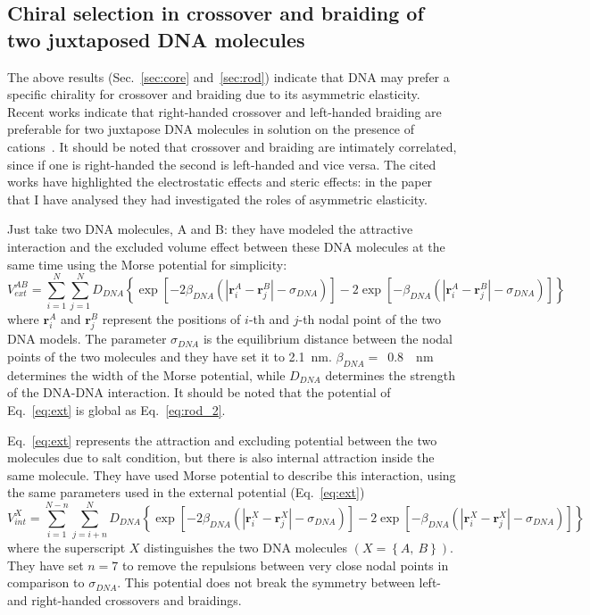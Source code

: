 \documentclass[a4paper,10pt]{article}
\begin{document}
\subsection{Chiral selection in crossover and braiding of two juxtaposed DNA molecules}\label{sec:braF}
The above results (Sec.~\ref{sec:core} and~\ref{sec:rod}) indicate that DNA may prefer a specific chirality for crossover and braiding due to its asymmetric elasticity.
Recent works indicate that right-handed crossover and left-handed braiding are preferable for two juxtapose DNA molecules in solution on the presence of cations~\cite{br_1, br_2, br_3, br_4, br_5}.
It should be noted that crossover and braiding are intimately correlated, since if one is right-handed the second is left-handed and vice versa.
The cited works have highlighted the electrostatic effects and steric effects: in the paper that I have analysed they had investigated the roles of asymmetric elasticity.

Just take two DNA molecules, A and B: they have modeled the attractive interaction and the excluded volume effect between these DNA molecules at the same time using the Morse potential for simplicity:
\begin{equation}\label{eq:ext}
V_{ext}^{AB}=\sum_{i=1}^{N}\sum_{j=1}^{N}D_{DNA}\left \{\exp\left [-2\beta_{DNA}\left (\left |\textbf{r}_{i}^{A}-\textbf{r}_{j}^{B}\right |-\sigma_{DNA}\right )\right ]-2\exp\left [-\beta_{DNA}\left (\left |\textbf{r}_{i}^{A}-\textbf{r}_{j}^{B}\right |-\sigma_{DNA}\right )\right ]\right \}
\end{equation}
where $\textbf{r}_{i}^{A}$ and $\textbf{r}_{j}^{B}$ represent the positions of $i$-th and $j$-th nodal point of the two DNA models.
The parameter $\sigma_{DNA}$ is the equilibrium distance between the nodal points of the two molecules and they have set it to \SI{2.1}{\nm}.
$\beta_{DNA}=$~\SI{0.8}{\per\nm} determines the width of the Morse potential, while $D_{DNA}$ determines the strength of the DNA-DNA interaction.
It should be noted that the potential of Eq.~\ref{eq:ext} is global as Eq.~\ref{eq:rod_2}.

Eq.~\ref{eq:ext} represents the attraction and excluding potential between the two molecules due to salt condition, but there is also internal attraction inside the same molecule.
They have used Morse potential to describe this interaction, using the same parameters used in the external potential (Eq.~\ref{eq:ext})
\begin{equation}\label{eq:int}
V_{int}^{X}=\sum_{i=1}^{N-n}\sum_{j=i+n}^{N}D_{DNA}\left \{\exp\left [-2\beta_{DNA}\left (\left |\textbf{r}_{i}^{X}-\textbf{r}_{j}^{X}\right |-\sigma_{DNA}\right )\right ]-2\exp\left [-\beta_{DNA}\left (\left |\textbf{r}_{i}^{X}-\textbf{r}_{j}^{X}\right |-\sigma_{DNA}\right )\right ]\right \}
\end{equation}
where the superscript $X$ distinguishes the two DNA molecules $\left (X=\left \{A,\ B\right \}\right )$.
They have set $n=7$ to remove the repulsions between very close nodal points in comparison to $\sigma_{DNA}$.
This potential does not break the symmetry between left- and right-handed crossovers and braidings.
\end{document}
